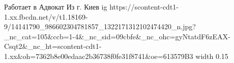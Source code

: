  

 
 
 
 

\par
Работает в Адвокат
Из г. Киев
\ifcmt
  ig https://scontent-cdt1-1.xx.fbcdn.net/v/t1.18169-9/14141790_986602304781857_1322171312102474420_n.jpg?_nc_cat=105&ccb=1-4&_nc_sid=09cbfe&_nc_ohc=gyNtatdF6zEAX-Csqt2&_nc_ht=scontent-cdt1-1.xx&oh=7362b8e00edaac2b36738f0fe31f8741&oe=613579B3
  width 0.15
\fi
